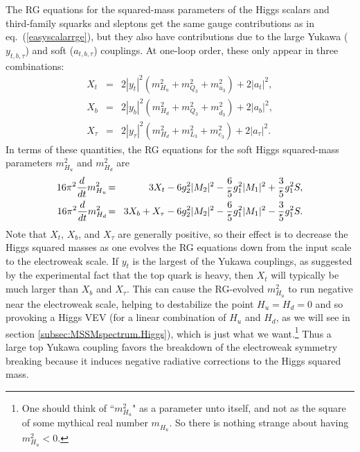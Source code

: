 \documentclass[11pt]{article}
\def\beq{\begin{eqnarray}}
\def\eeq{\end{eqnarray}}
\def\sbar{\overline}
\begin{document}
The RG equations for the squared-mass parameters of the Higgs scalars and
third-family squarks and sleptons get the same gauge contributions as in
eq.~(\ref{easyscalarrge}), but they also have contributions due to the
large Yukawa ($y_{t,b,\tau}$) and soft ($a_{t,b,\tau}$) couplings. At
one-loop order, these only appear in three combinations: 
\beq
X_t \!&=&\!  2 |y_t|^2 (m_{H_u}^2 + m_{Q_3}^2 + m_{\sbar u_3}^2) +2 |a_t|^2,
\\
X_b \!&=& \! 2 |y_b|^2 (m_{H_d}^2 + m_{Q_3}^2 + m_{\sbar d_3}^2) +2 |a_b|^2,
\\
X_\tau\! &=&\!  2 |y_\tau|^2 (m_{H_d}^2 + m_{L_3}^2 + m_{\sbar e_3}^2)
+ 2 |a_\tau|^2.
\eeq
In terms of these quantities, the RG equations for the soft Higgs
squared-mass parameters $m_{H_u}^2$ and $m_{H_d}^2$ are
\beq
16 \pi^2 {d\over dt} m_{H_u}^2 \!&=&\!
3 X_t - 6 g_2^2 |M_2|^2 - {6\over 5} g_1^2 |M_1|^2 + \frac{3}{5} g^{2}_1 S
,
\label{mhurge}
\\
16\pi^2{d\over dt} m_{H_d}^2 \!&=&\!
3 X_b + X_\tau - 6 g_2^2 |M_2|^2 - {6\over 5} g_1^2 |M_1|^2 - \frac{3}{5} 
g^{2}_1 S
.
\label{mhdrge}
\eeq
Note that $X_t$, $X_b$, and $X_\tau$ are generally positive, so their
effect is to decrease the Higgs squared masses as one evolves the RG equations
down from the input scale to the electroweak scale. If $y_t$ is the
largest of the Yukawa couplings, as suggested by the experimental fact
that the top quark is heavy, then $X_t$ will typically be much larger than
$X_b$ and $X_\tau$. This can cause the RG-evolved $m_{H_u}^2$ to run
negative near the electroweak scale, helping to destabilize the point $H_u
= H_d = 0$ and so provoking a Higgs VEV (for a linear combination of $H_u$
and $H_d$, as we will see in section \ref{subsec:MSSMspectrum.Higgs}),
which is just what we want.\footnote{One should think of ``$m_{H_u}^2$" as
a parameter unto itself, and not as the square of some mythical real
number $m^{\phantom{2}}_{H_u}$. So there is nothing strange about having
$m_{H_u}^2 < 0$.
} Thus a large top Yukawa coupling favors
the breakdown of the electroweak symmetry breaking because it induces
negative radiative corrections to the Higgs squared mass. 
\end{document}
